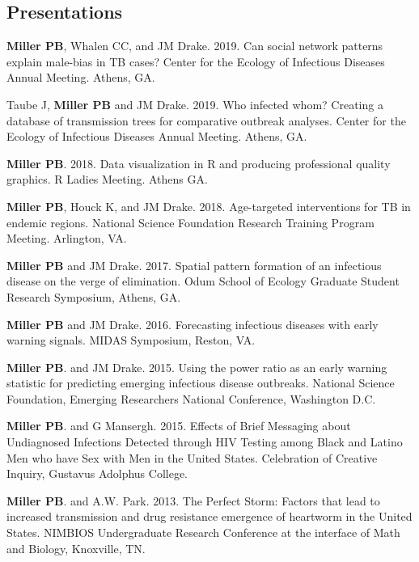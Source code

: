 \documentclass[letterpaper]{article}
\renewenvironment{itemize}{
  \begin{list}{}{
    \setlength{\leftmargin}{1.5em}
  }
}{
  \end{list}
}
\begin{document}
\subsection*{Presentations}
\begin{itemize}
\item  \textbf{Miller PB}, Whalen CC, and JM Drake. 2019. Can social network patterns explain male-bias in TB cases? Center for the Ecology of Infectious Diseases Annual Meeting. Athens, GA.
\item Taube J, \textbf{Miller PB} and JM Drake. 2019. Who infected whom? Creating a database of transmission trees for comparative outbreak analyses. Center for the Ecology of Infectious Diseases Annual Meeting. Athens, GA.
\item \textbf{Miller PB}. 2018. Data visualization in R and producing professional quality graphics. R Ladies Meeting. Athens GA. 
\item   \textbf{Miller PB}, Houck K, and JM Drake. 2018. Age-targeted interventions for TB in endemic regions. National Science Foundation Research Training Program Meeting. Arlington, VA. 
\item  \textbf{Miller PB} and JM Drake. 2017. Spatial pattern formation of an infectious disease on the verge of elimination. Odum School of Ecology Graduate Student Research Symposium, Athens, GA. 
\item \textbf{Miller PB} and JM Drake. 2016. Forecasting infectious diseases with early warning signals. MIDAS Symposium, Reston, VA. 
\item \textbf{Miller PB}. and JM Drake. 2015. Using the power ratio as an early warning statistic for predicting emerging infectious disease outbreaks. National Science Foundation, Emerging Researchers National Conference, Washington D.C.
\item \textbf{Miller PB}. and G Mansergh. 2015. Effects of Brief Messaging about Undiagnosed Infections Detected through HIV Testing among Black and Latino Men who have Sex with Men in the United States. Celebration of Creative Inquiry, Gustavus Adolphus College.
\item \textbf{Miller PB}. and A.W. Park. 2013. The Perfect Storm: Factors that lead to increased transmission and drug resistance emergence of heartworm in the United States. NIMBIOS Undergraduate Research Conference at the interface of Math and Biology, Knoxville, TN.
\end{itemize}
\end{document}
